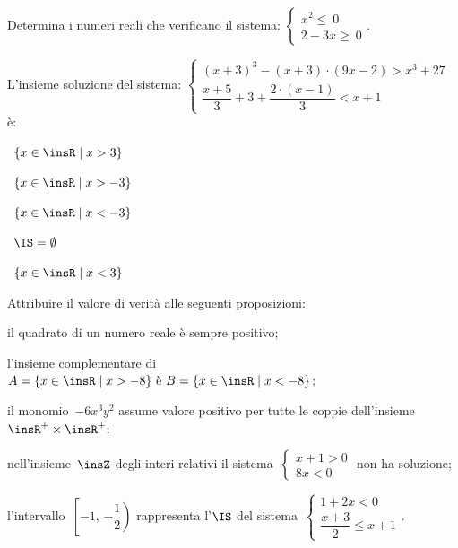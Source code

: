 \begin{esercizio}[\Ast]
 \label{ese:21.34}
 Determina i numeri reali che verificano il sistema:
 $\left\{%
  \begin{array}{l}
  x^{2}\le~0
  \\2-3x\ge~0
 \end{array}\right..$
 \end{esercizio}

\begin{esercizio}
 \label{ese:21.35}
 L'insieme soluzione del sistema:
$\left\{\begin{array}{l}
  (x+3)^{3}-(x+3)\cdot (9x-2)>x^{3}+27\\
  \dfrac{x+5}{3}+3+\dfrac{2\cdot (x-1)}{3}<x+1
 \end{array}\right.$ è:
\begin{multicols}{2}
\boxA\quad~$\left\{x\in \insR \mid x>3\right\}$

\boxB\quad~$\left\{x\in \insR \mid x>-3\right\}$

\boxC\quad~$\left\{x\in \insR \mid x<-3\right\}$

\boxD\quad~$\IS=\emptyset $

\boxE\quad~$\left\{x\in\insR \mid x<3\right\}$
\end{multicols}

\end{esercizio}

\begin{esercizio}
 \label{ese:21.36}
 Attribuire il valore di verità alle seguenti proposizioni:

\begin{enumeratea}
\item il quadrato di un numero reale è sempre positivo;
\item l'insieme complementare di~$A=\{x\in\insR\;|\;x>-8\}\text{ è }B=\{x\in\insR \mid x<-8\}$;
\item il monomio~$-6x^{3}y^{2}$ assume valore positivo per tutte le coppie dell'insieme~$\insR^{+}\times\insR^{+}$;
\item nell'insieme~$\insZ$ degli interi relativi il sistema~$\left\{\begin{array}{l}x+1>0\\8x<0\end{array}\right.$ non ha soluzione;
\item l'intervallo~$\left[-1\text{,~}\left.-{\dfrac{1}{2}}\right)\right.$ rappresenta l'$\IS$ del sistema~$\left\{\begin{array}{l}1+2x<0 \\\dfrac{x+3}{2}\le x+1\end{array}\right.$.
\end{enumeratea}
\end{esercizio}

